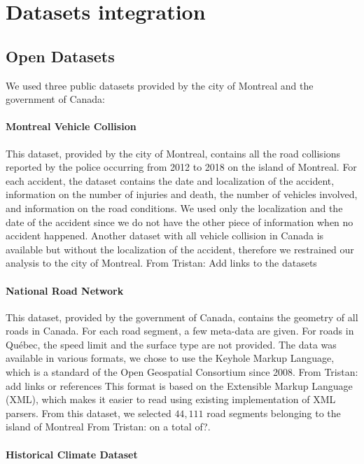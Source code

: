 \documentclass[conference]{IEEEtran}
\newcommand{\TG}[1]{\colorlet{saved}{.}\color{orange}From Tristan: #1\color{saved}}
\begin{document}
\section{Datasets integration}

\subsection{Open Datasets}
\label{sec:datasets}

We used three public datasets provided by the city of Montreal and the government of Canada: 

\paragraph{Montreal Vehicle Collision}

This dataset, provided by the city of Montreal, contains all the road
collisions reported by the police occurring from 2012 to 2018 on the island
of Montreal. For each accident, the dataset contains the date and
localization of the accident, information on the number of injuries and
death, the number of vehicles involved, and information on the road
conditions. We used only the localization and the date of the accident since
we do not have the other piece of information when no accident happened.
Another dataset with all vehicle collision in Canada is available but
without the localization of the accident, therefore we restrained our
analysis to the city of Montreal. \TG{Add links to the datasets}

\paragraph{National Road Network}

This dataset, provided by the government of Canada, contains the geometry of
all roads in Canada. For each road segment, a few meta-data are given. For
roads in Québec, the speed limit and the surface type are not provided. The
data was available in various formats, we chose to use the Keyhole Markup
Language, which is a standard of the Open Geospatial Consortium since 2008. \TG{add links or references}
This format is based on the Extensible Markup Language (XML), which makes it
easier to read using existing implementation of XML parsers. From this
dataset, we selected $44,111$ road segments belonging to the island of
Montreal \TG{on a total of?}.

\paragraph{Historical Climate Dataset}
\end{document}
